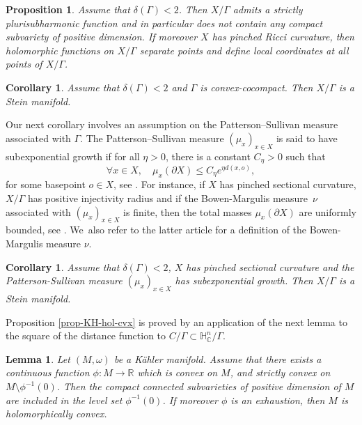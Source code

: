 \documentclass[JEP,XML,SOM,Unicode,NoEqCountersInSection,published]{cedram}
\newtheorem{corollary}[theorem]{Corollary}
\newtheorem{proposition}[theorem]{Proposition}
\newtheorem{lemma}[theorem]{Lemma}
\theoremstyle{definition}
\newcommand{\C}{\mathbb{C}}
\newcommand{\R}{\mathbb{R}}
\newcommand{\HNC}{\mathbb{H}^{n}_{\C}}
\def\C{\mathbb{C}}
\newcommand{\HNC}{\mathbb{H}^{n}_{\C}}
\begin{document}
\begin{proposition}\label{prop-KH-ss-ens}
Assume that $\delta(\Gamma)<2$. Then $X/\Gamma$ admits a strictly plurisubharmonic function and in particular does not contain any compact subvariety of positive dimension. If moreover $X$ has pinched Ricci curvature, then holomorphic functions on $X/\Gamma$ separate points and define local coordinates at all points of $X/\Gamma$.
\end{proposition}

\begin{corollary}\label{cor-cvx+delta:stein}
Assume that $\delta(\Gamma)<2$ and $\Gamma$ is convex-cocompact. Then $X/\Gamma$ is a Stein manifold.
\end{corollary}

Our next corollary involves an assumption on the Patterson--Sullivan measure associated with $\Gamma$. The Patterson--Sullivan measure $(\mu_x)_{x\in X}$ is said to have subexponential growth if for all $\eta>0$, there is a constant $C_{\eta}>0$ such that
\begin{equation*}
\forall x\in X,\quad \mu_x(\partial X) \le C_{\eta}e^{\eta d(x,o)},
\end{equation*}
for some basepoint $o\in X$, see \cite[\S1.4]{connellNaturalFlowCritical2023}. For instance, if $X$ has pinched sectional curvature, $X/\Gamma$ has positive injectivity radius and if the Bowen-Margulis measure~$\nu$ associated with $(\mu_x)_{x\in X}$ is finite, then the total masses $\mu_x(\partial X)$ are uniformly bounded, see \cite[Th.\,1.15]{connellNaturalFlowCritical2023}. We~also refer to the latter article for a definition of the Bowen-Margulis measure $\nu$.

\begin{corollary}\label{cor:delta-croissance-ssexp}
Assume that $\delta(\Gamma)<2$, $X$ has pinched sectional curvature and the Patterson-Sullivan measure $(\mu_x)_{x\in X}$ has subexponential growth. Then $X/\Gamma$ is a Stein manifold.
\end{corollary}

Proposition \ref{prop-KH-hol-cvx} is proved by an application of the next lemma to the square of the distance function to $C/\Gamma\subset\HNC/\Gamma$.

\begin{lemma}\label{lem-cvx-psh}
Let $(M,\omega)$ be a Kähler manifold. Assume that there exists a continuous function $\phi:M\to \R$ which is convex on $M$, and strictly convex on $M\setminus \phi^{-1}(0)$. Then the compact connected subvarieties of positive dimension of $M$ are included in the level set $\phi^{-1}(0)$. If moreover $\phi$ is an exhaustion, then $M$ is holomorphically convex.
\end{lemma}
\end{document}
